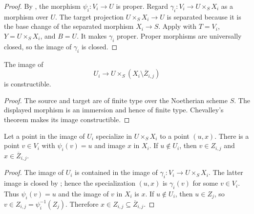 \begin{proof}
  By , the morphism
  $\psi_i\colon V_i\to U$ is proper.  Regard
  $\gamma_i\colon V_i\to U\times_SX_i$ as a morphism over $U$.  The target
  projection $U\times_SX_i\to U$ is separated because it is the base change
  of the separated morphism $X_i\to S$.  Apply
   with
  $T=V_i$, $Y=U\times_SX_i$, and $B=U$.  It makes $\gamma_i$ proper.
  Proper morphisms are universally closed, so the image of $\gamma_i$ is
  closed.
\end{proof}

\begin{lemma}
  \label{lemma:nagata-intermediate-overlap-constructible}

  The image of
  \[
    U_i\longrightarrow
    U\times_S(X_i\setminus\overline Z_{i,j})
  \]
  is constructible.
\end{lemma}

\begin{proof}
  The source and target are of finite type over the Noetherian scheme $S$.
  The displayed morphism is an immersion and hence of finite type.  Chevalley's
  theorem makes its image constructible.
\end{proof}

\begin{lemma}
  \label{lemma:nagata-intermediate-specialization-boundary}

  Let a point in the image of $U_i$ specialize in $U\times_SX_i$ to a point
  $(u,x)$.  There is a point $v\in V_i$ with
  $\psi_i(v)=u$ and image $x$ in $X_i$.  If $u\notin U_i$, then
  $v\in Z_{i,j}$ and $x\in\overline Z_{i,j}$.
\end{lemma}

\begin{proof}
  The image of $U_i$ is contained in the image of
  $\gamma_i\colon V_i\to U\times_SX_i$.  The latter image is closed by
  ; hence the specialization
  $(u,x)$ is $\gamma_i(v)$ for some $v\in V_i$.  Thus
  $\psi_i(v)=u$ and the image of $v$ in $X_i$ is $x$.  If $u\notin U_i$, then
  $u\in Z_j$, so $v\in Z_{i,j}=\psi_i^{-1}(Z_j)$.  Therefore
  $x\in Z_{i,j}\subseteq\overline Z_{i,j}$.
\end{proof}

